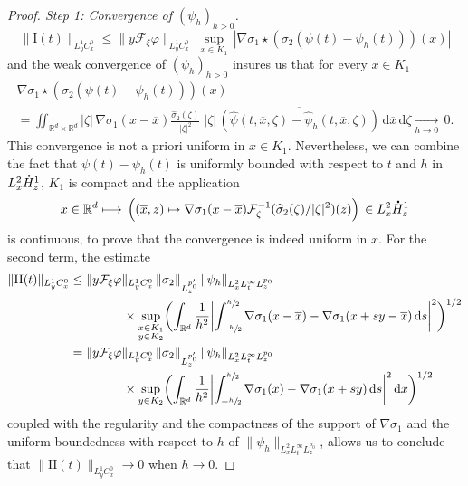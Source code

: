 \documentclass[10pt]{amsart}
\let\bar\oldbar
\let\hat\oldhat
\theoremstyle{definition}
\newcommand*{\overbigdot}[1]{%
\accentset{\mbox{\large\bfseries .}}{#1}}
\let\bar\overline
\let\hat\widehat
\newcommand{\R}{\mathbb{R}}
\newcommand{\ud}{\, {\mathrm{d}}}
\begin{document}
\begin{proof}[Proof. Step 1: Convergence of $(\psi_{h})_{h>0}$]
\[
\|\mathrm{I}(t)\|_{L_{y}^{1}C_{x}^{0}}\leq\|y\mathcal{F}_{\xi}\varphi\|_{L_{y}^{1}C_{x}^{0}}\;\underset{x\in K_{1}}{\sup}\,\left|\nabla\sigma_{1}\star\left(\sigma_{2}(\psi(t)-\psi_{h}(t))\right)(x)\right|
\]
and the weak convergence of $(\psi_{h})_{h>0}$ insures us that for every $x\in K_1$
\begin{multline*}
\nabla\sigma_{1}\star\left(\sigma_{2}(\psi(t)-\psi_{h}(t))\right)(x)\\
=\iint_{\R^{d}\times\R^{d}}|\zeta|\,\nabla\sigma_{1}(x-\bar{x})\frac{\hat{\sigma}_{2}(\zeta)}{|\zeta|^{2}}\;|\zeta|\,\overline{\left(\hat{\psi}(t,\bar{x},\zeta)-\hat{\psi}_{h}(t,\bar{x},\zeta)\right)}
\ud \bar x \ud\zeta\underset{h\to 0}{\to}\,0.
\end{multline*}
This convergence is not a priori uniform in $x\in K_1$. Nevertheless, we can combine the fact that $\psi(t)-\psi_{h}(t)$ is uniformly bounded with respect to $t$ and $h$ in $L_{x}^{2}\overbigdot{H}_{z}^{1}$, $K_1$ is compact and the application
\[
x\in\mathbb R^d \longmapsto\,\left((\bar{x},z)\mapsto\nabla\sigma_{1}(x-\bar{x})\mathcal{F}_{\zeta}^{-1}(\hat{\sigma}_{2}(\zeta)/|\zeta|^{2})(z)\right)\,\in L_{x}^{2}\overbigdot{H}_{z}^{1}
\]
is continuous,
to prove that the convergence is indeed uniform in $x$. For the second term, the estimate\enlargethispage{-\baselineskip}
\begin{align*}
\|\mathrm{II}(t)\|_{L_{y}^{1}C_{x}^{0}}&\leq \|y\mathcal{F}_{\xi}\varphi\|_{L_{y}^{1}C_{x}^{0}}\,\|\sigma_{2}\|_{L_{z}^{p_{0}'}}\,\|\psi_{h}\|_{L_{x}^{2}L_{t}^{\infty}L_{z}^{p_{0}}}\\
&\hspace*{1.5cm}\times\underset{\substack{x\in K_{1} \\ y\in K_{2}}}{\sup}\biggl(\int_{\R^{d}}\frac{1}{h^{2}}\biggl|\int_{-\sfrac{h}{2}}^{\sfrac{h}{2}}\nabla\sigma_{1}(x-\bar{x})-\nabla\sigma_{1}(x+sy-\bar{x})\ud s\biggr|^{2}\biggr)^{1/2}\\
&=\|y\mathcal{F}_{\xi}\varphi\|_{L_{y}^{1}C_{x}^{0}}\,\|\sigma_{2}\|_{L_{z}^{p_{0}'}}\,\|\psi_{h}\|_{L_{x}^{2}L_{t}^{\infty}L_{z}^{p_{0}}}\\
&\hspace*{1.5cm}\times \underset{y\in K_{2}}{\sup}\biggl(\int_{\R^{d}}\frac{1}{h^{2}}\biggl|\int_{-\sfrac{h}{2}}^{\sfrac{h}{2}}\nabla\sigma_{1}(x)-\nabla\sigma_{1}(x+sy)\ud s\biggr|^{2}\ud x\biggr)^{1/2}
\end{align*}
coupled with the regularity and the compactness of the support of $\nabla\sigma_{1}$ and the uniform boundedness with respect to $h$ of $\|\psi_{h}\|_{L_{x}^{2}L_{t}^{\infty}L_{z}^{p_{0}}}$, allows us to conclude that $\|\mathrm{II}(t)\|_{L_{y}^{1}C_{x}^{0}}\to 0$ when $h\to 0$.


\end{proof}
\end{document}
